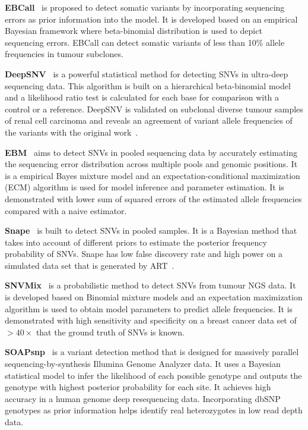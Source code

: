 \documentclass[a4,center,fleqn]{NAR}
\begin{document}
\textbf{EBCall}~\citep{Shiraishi2013} is proposed to detect somatic variants by incorporating sequencing errors as prior information into the model.
It is developed based on an empirical Bayesian framework where beta-binomial distribution is used to depict sequencing errors.
EBCall can detect somatic variants of less than 10\% allele frequencies in tumour subclones.

\textbf{DeepSNV}~\citep{gerstung2012reliable} is a powerful statistical method for detecting SNVs in ultra-deep sequencing data.
This algorithm is built on a hierarchical beta-binomial model and a likelihood ratio test is calculated for each base for comparison with a control or a reference.
DeepSNV is validated on subclonal diverse tumour samples of renal cell carcinoma and reveals an agreement of variant allele frequencies of the variants with the original work~\citep{gerstung2012reliable}.

\textbf{EBM}~\citep{Zhou2012} aims to detect SNVs in pooled sequencing data by accurately estimating the sequencing error distribution across multiple pools and genomic positions. 
It is a empirical Bayes mixture model and an expectation-conditional maximization (ECM) algorithm is used for model inference and parameter estimation.
It is demonstrated with lower sum of squared errors of the estimated allele frequencies compared with a naive estimator.

\textbf{Snape}~\citep{Raineri2012} is built to detect SNVs in pooled samples.
It is a Bayesian method that takes into account of different priors to estimate the posterior frequency probability of SNVs.
Snape has low false discovery rate and high power on a simulated data set that is generated by ART~\citep{huang2012art}.

\textbf{SNVMix}~\citep{Goya2010} is a probabilistic method to detect SNVs from tumour NGS data.
It is developed based on Binomial mixture models and an expectation maximization algorithm is used to obtain model parameters to predict allele frequencies.
It is demonstrated with high sensitivity and specificity on a breast cancer data set of $> 40 \times$ that the ground truth of SNVs is known.

\textbf{SOAPsnp}~\citep{Li2009} is a variant detection method that is designed for massively parallel sequencing-by-synthesis Illumina Genome Analyzer data.
It uses a Bayesian statistical model to infer the likelihood of each possible genotype and outputs the genotype with highest posterior probability for each site.
It achieves high accuracy in a human genome deep resequencing data.
Incorporating dbSNP genotypes as prior information helps identify real heterozygotes in low read depth data.
\end{document}
